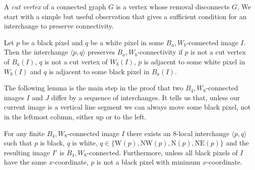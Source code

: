 \documentclass[lotsofwhite,charterfonts]{patmorin}
\newcommand{\foureight}{B_4,W_8}
\newcommand{\N}{\mathrm{N}}
\newcommand{\NE}{\mathrm{NE}}
\newcommand{\W}{\mathrm{W}}
\newcommand{\NW}{\mathrm{NW}}
\newcommand{\ic}[2]{\langle #1,#2 \rangle}
\begin{document}
A \emph{cut vertex} of a connected graph $G$ is a vertex whose removal
disconnects $G$.  We start with a simple but useful observation that
gives a sufficient condition for an interchange to preserve
connectivity.

\begin{obs}
Let $p$ be a black pixel and $q$ be a white pixel in some
$B_a,W_b$-connected image $I$.  Then the interchange $\ic{p}{q}$
preserves $B_a,W_b$-connectivity if $p$ is not a cut vertex of $B_a(I)$,
$q$ is not a cut vertex of $W_b(I)$, $p$ is adjacent to some white pixel
in $W_b(I)$ and $q$ is adjacent to some black pixel in $B_a(I)$.
\end{obs}

The following lemma is the main step in the proof that two
$B_4,W_8$-connected images $I$ and $J$ differ by a sequence of
interchanges.  It tells us that, unless our current image is a
vertical line segment we can always move some black pixel, not in the
leftmost column, either up or to the left.

\begin{lem}
For any finite $\foureight$-connected image $I$ there exists an
$8$-local interchange $\ic{p}{q}$ such that $p$ is black, $q$ is
white, $q\in\{\W(p),\NW(p),\N(p),\NE(p)\}$ and the resulting image
$I'$ is $\foureight$-connected. Furthermore, unless all black pixels
of $I$ have the same $x$-coordinate, $p$ is not a black
pixel with minimum $x$-coordinate.
\end{lem}
\end{document}
